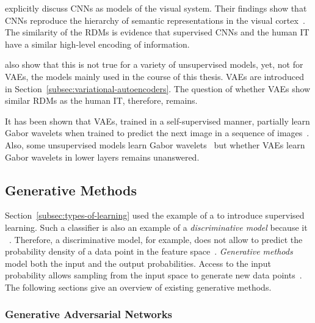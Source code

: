 \citet{eickenberg2017seeing} explicitly discuss \acp{CNN} as models of the visual system.
Their findings show that \acp{CNN} reproduce the hierarchy of semantic representations in the visual cortex~\citep{eickenberg2017seeing, wen2018neural}.
The similarity of the \acp{RDM} is evidence that supervised \acp{CNN} and the human \ac{IT} have a similar high-level encoding of information.

\citet{khaligh2014deep} also show that this is not true for a variety of unsupervised models, yet, not for \acp{VAE}, the models mainly used in the course of this thesis.
\acp{VAE} are introduced in Section~\ref{subsec:variational-autoencoders}.
The question of whether \acp{VAE} show similar \acp{RDM} as the human \ac{IT}, therefore, remains.

It has been shown that \acp{VAE}, trained in a self-supervised manner, partially learn Gabor wavelets when trained to predict the next image in a sequence of images~\citep{palm2012prediction}.
Also, some unsupervised models learn Gabor wavelets~\citep{Olshausen1996,berkes2005slow} but whether \acp{VAE} learn Gabor wavelets in lower layers remains unanswered.

\subsection{Generative Methods}\label{subsec:generative-methods}

Section~\ref{subsec:types-of-learning} used the example of a  to introduce supervised learning.
Such a classifier is also an example of a \textit{discriminative model} because it ~\citep[p. 43]{bishop2006pattern}.
Therefore, a discriminative model, for example, does not allow to predict the probability density of a data point in the feature space~\citep[pp. 43,44]{bishop2006pattern}.
\textit{Generative methods} model both the input and the output probabilities.
Access to the input probability allows sampling from the input space to generate new data points~\citep[p. 43]{bishop2006pattern}.
The following sections give an overview of existing generative methods.

\subsubsection{Generative Adversarial Networks}\label{subsubsec:gans}


